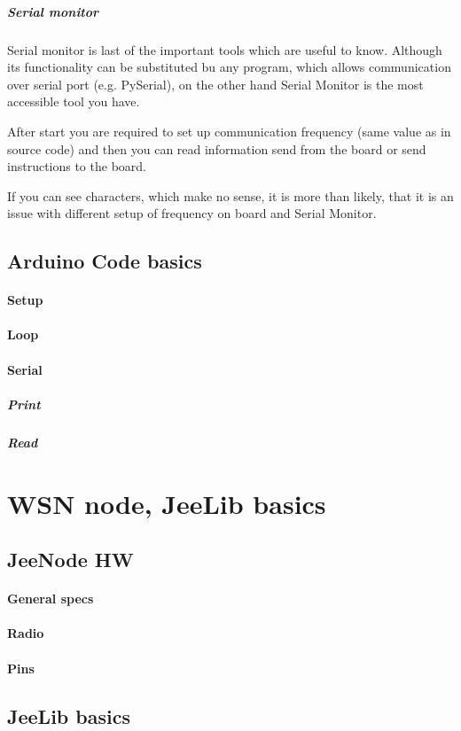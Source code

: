 \documentclass[12pt,titlepage]{article}
\begin{document}
		\subparagraph{Serial monitor}
		Serial monitor is last of the important tools which are useful to know. Although its functionality can be substituted bu any program, which allows communication over serial port (e.g. PySerial), on the other hand Serial Monitor is the most accessible tool you have.

		After start you are required to set up communication frequency (same value as in source code) and then you can read information send from the board or send instructions to the board.

		If you can see characters, which make no sense, it is more than likely, that it is an issue with different setup of frequency on board and Serial Monitor. 

	\subsection{Arduino Code basics}
		\paragraph{Setup}
		\paragraph{Loop}
		\paragraph{Serial}
			\subparagraph{Print}
			\subparagraph{Read}

\section{WSN node, JeeLib basics}

	\subsection{JeeNode HW }
		\paragraph{General specs}
		\paragraph{Radio}
		\paragraph{Pins}

	\subsection{JeeLib basics}
\end{document}
